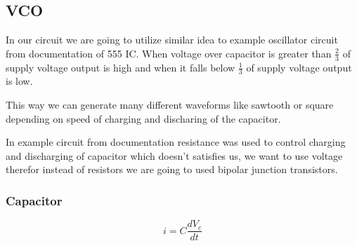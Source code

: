\documentclass[english,10pt,a4paper]{article}
\begin{document}
	\subsection{VCO}
	In our circuit we are going to utilize similar idea to example oscillator circuit from documentation of 555 IC. When voltage over capacitor is greater than $\frac{2}{3}$ of supply voltage output is high and when it falls below $\frac{1}{3}$ of supply voltage output is low.
	
	This way we can generate many different waveforms like sawtooth or square depending on speed of charging and discharing of the capacitor.
	
	In example circuit from documentation resistance was used to control charging and discharging of capacitor which doesn't satisfies us, we want to use voltage therefor instead of resistors we are going to used bipolar junction transistors.
	\subsubsection{Capacitor}
	
	\begin{equation}
		i = C \dfrac{dV_c}{dt}
	\end{equation}
	
		

	
	
	
\end{document}

